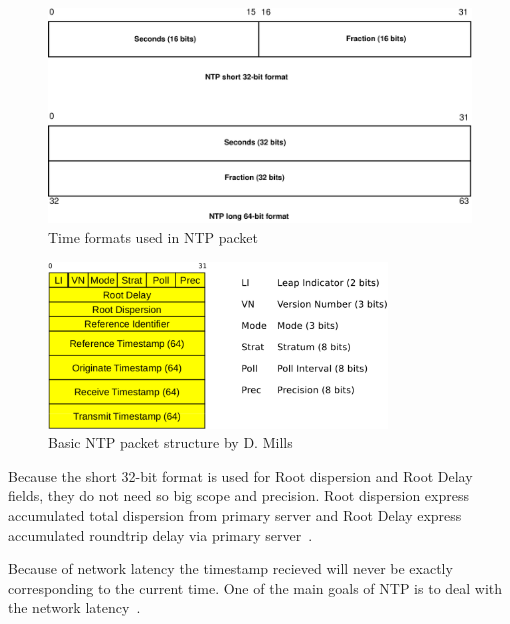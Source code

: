 \begin{figure}
	\centering
	\includegraphics[width=13cm,keepaspectratio]{fig/ntp-timestamps.pdf}
	\caption{Time formats used in NTP packet}
	\label{fig:ntp-timestamps}
	\bigskip
\end{figure}


\begin{figure}
	\centering
	\includegraphics[width=9cm,keepaspectratio]{fig/ntp-packet.pdf}
	\caption{Basic NTP packet structure by D. Mills}
	\label{fig:ntp-packet}
	\bigskip
\end{figure}

Because the short 32-bit format is used for Root dispersion and Root Delay fields,
they do not need so big scope and precision.
Root dispersion express accumulated total dispersion from primary server
and Root Delay express accumulated roundtrip delay via primary server~\cite{ntp-arch}.


Because of network latency the timestamp recieved will never be exactly corresponding to
the current time.
One of the main goals of NTP is to deal with the network latency~\cite{ntp-overview}.
